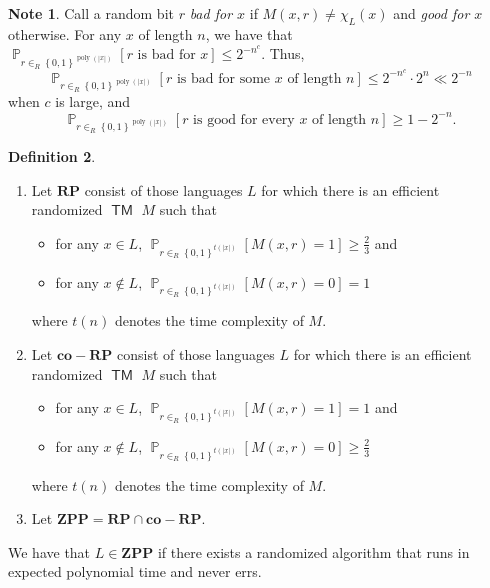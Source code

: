 \documentclass[10pt,letterpaper,cm]{nupset}
\theoremstyle{definition}
\newtheorem{definition}{Definition}[subsection]
\newtheorem{note}[definition]{Note}
\theoremstyle{theorem}
\theoremstyle{remark}
\newcommand{\1}{\mathbf{1}}
\newcommand{\0}{\vec 0}
\DeclareMathOperator{\pr}{\mathbb{P}}
\DeclareMathOperator{\TM}{\mathsf{TM}}
\DeclareMathOperator{\poly}{poly}
\begin{document}
\begin{note}\label{good}
Call a random bit $r$ \textit{bad for $x$} if $M(x, r) \ne \chi_L(x)$ and \textit{good for $x$} otherwise. For any $x$ of length $n$, we have that  $\pr_{r\in_R \left\{0,1\right\}^{\poly(\left\lvert{x}\right\rvert)}}\left[r \text{ is bad for }x\right] \leq 2^{{-}n^c}$. Thus, $$\pr_{r\in_R \left\{0,1\right\}^{\poly(\left\lvert{x}\right\rvert)}}\left[r \text{ is bad for some }x \text{ of length }n\right] \leq 2^{{-}n^c}\cdot 2^n \ll 2^{{-}n}$$ when $c$ is large, and $$\pr_{r\in_R \left\{0,1\right\}^{\poly(\left\lvert{x}\right\rvert)}}\left[r \text{ is good for every }x \text{ of length }n\right] \geq 1 - 2^{{-}n}.$$
\end{note}

\pagebreak

\begin{definition} $ $
\begin{enumerate}
\item Let $\mathbf{RP}$ consist of those languages $L$ for which there is an efficient randomized $\TM$ $M$ such that 
\begin{itemize}
\item for any $x\in L$, $\pr_{r\in_R \left\{0,1\right\}^{t(\left\lvert{x}\right\rvert)}}\left[M(x,r)=1\right] \geq \frac{2}{3}$ and
\item for any $x\notin L$, $\pr_{r\in_R \left\{0,1\right\}^{t(\left\lvert{x}\right\rvert)}}\left[M(x,r)=0\right] = 1$
\end{itemize} where $t(n)$ denotes the time complexity of $M$.
\item Let $\mathbf{co{-}RP}$ consist of those languages $L$ for which there is an efficient randomized $\TM$ $M$ such that 
\begin{itemize}
\item for any $x\in L$, $\pr_{r\in_R \left\{0,1\right\}^{t(\left\lvert{x}\right\rvert)}}\left[M(x,r)=1\right]= 1$ and
\item for any $x\notin L$, $\pr_{r\in_R \left\{0,1\right\}^{t(\left\lvert{x}\right\rvert)}}\left[M(x,r)=0\right] \geq \frac{2}{3}$
\end{itemize} where $t(n)$ denotes the time complexity of $M$.
\item Let $\mathbf{ZPP} = \mathbf{RP} \cap \mathbf{co{-}RP}$.
\end{enumerate}
\end{definition}

\smallskip


We have that $L \in \mathbf{ZPP}$ if there exists a randomized algorithm that runs in expected polynomial time and never errs. 
\end{document}
